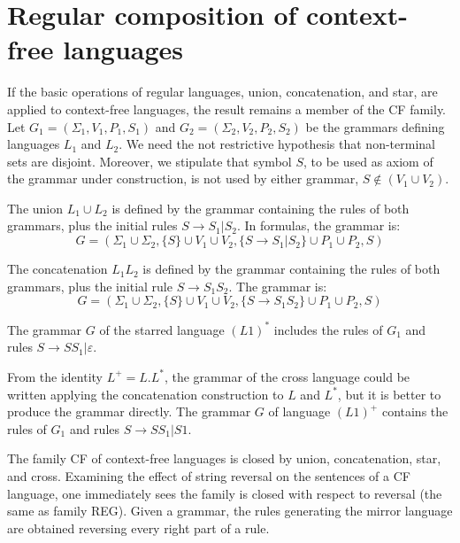 \section{Regular composition of context-free languages}

If the basic operations of regular languages, union, concatenation, and star, are applied to context-free languages, the result remains a member of the CF family. Let $G_1=(\Sigma_1,V_1,P_1,S_1)$
and $G_2=(\Sigma_2,V_2,P_2,S_2)$ be the grammars defining languages $L_1$ and $L_2$. We need the not restrictive hypothesis that non-terminal sets are disjoint. Moreover, we stipulate that symbol $S$, 
to be used as axiom of the grammar under construction, is not used by either grammar, $S \notin (V_1 \cup V_2)$.
\begin{definition}[Union]
    The union $L_1 \cup L_2$ is defined by the grammar containing the rules of both grammars, plus the initial rules $S\rightarrow S_1|S_2$. In formulas, the grammar is: 
    \[G=\left(\Sigma_1 \cup \Sigma_2,\{S\} \cup V_1 \cup V_2,\{S\rightarrow S_1|S_2\} \cup P_1 \cup P_2,S\right)\]
\end{definition}
\begin{definition}[Concatenation]
    The concatenation $L_1L_2$ is defined by the grammar containing the rules of both grammars, plus the initial rule $S\rightarrow S_1S_2$. The grammar is: 
    \[G=\left(\Sigma_1 \cup \Sigma_2,\{S\} \cup V_1 \cup V_2,\{S\rightarrow S_1S_2\} \cup P_1 \cup P_2,S\right)\] 
\end{definition}
\begin{definition}[Star]
    The grammar $G$ of the starred language $(L1)^{*}$ includes the rules of $G_1$ and rules $S \rightarrow SS_1|\varepsilon$.
\end{definition}
\begin{definition}[Cross]
    From the identity $L^{+}=L.L^{*}$, the grammar of the cross language could be written applying the concatenation construction to $L$ and $L^{*}$, but it is better to produce the grammar directly. 
    The grammar $G$ of language $(L1)^{+}$ contains the rules of $G_1$ and rules $S \rightarrow SS_1|S1$. 
\end{definition}
The family CF of context-free languages is closed by union, concatenation, star, and cross. Examining the effect of string reversal on the sentences of a CF language, one immediately sees the family 
is closed with respect to reversal (the same as family REG). Given a grammar, the rules generating the mirror language are obtained reversing every right part of a rule.